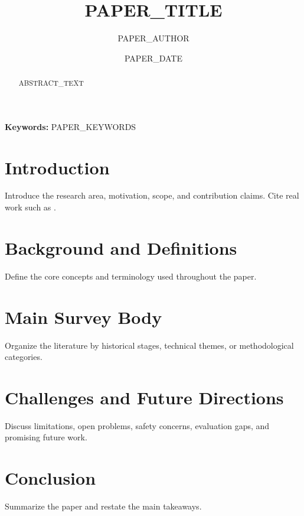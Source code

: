 \documentclass[11pt,a4paper]{article}
\title{\textbf{PAPER_TITLE}}
\author{PAPER_AUTHOR}
\date{PAPER_DATE}
\begin{document}
\maketitle

\begin{abstract}
ABSTRACT_TEXT
\end{abstract}

\vspace{0.5em}
\noindent\textbf{Keywords:} PAPER_KEYWORDS

\section{Introduction}
\label{sec:introduction}

Introduce the research area, motivation, scope, and contribution claims. Cite real work such as \citet{vaswani2017attention}.

\section{Background and Definitions}
\label{sec:background}

Define the core concepts and terminology used throughout the paper.

\section{Main Survey Body}
\label{sec:survey-body}

Organize the literature by historical stages, technical themes, or methodological categories.

\section{Challenges and Future Directions}
\label{sec:challenges}

Discuss limitations, open problems, safety concerns, evaluation gaps, and promising future work.

\section{Conclusion}
\label{sec:conclusion}

Summarize the paper and restate the main takeaways.



\end{document}
